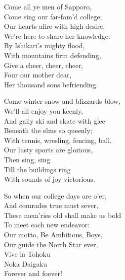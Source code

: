 \documentclass[10pt,b5j]{tarticle} %
\begin{document}
\vspace{1.5em} %
\newcommand{\linespace}{0.5em} %
\newcommand{\blocksize}{0.5\hsize} %
\begin{enumerate} %
    \begin{minipage}[c]{\blocksize}
    
        \vspace{\linespace}
        \item
        Come all ye men of Sapporo,\\
          Come sing our far-fam'd college;\\
        Our hearts afire with high desire,\\
          We're here to share her knowledge:\\
        By Ishikari's mighty flood,\\
          With mountains firm defending,\\
            Give a cheer, cheer, cheer,\\
            Four our mother dear,\\
          Her thousand sons befriending.
        
        \vspace{\linespace}
        \item
        Come winter snow and blizzards blow,\\
          We'll all enjoy you keenly,\\
        And gaily ski and skate with glee\\
          Beneath the elms so queenly;\\
        With tennis, wresling, fencing, ball,\\
          Our lusty sports are glorious,\\
            Then sing, sing\\
            Till the buildings ring\\
        With sounds of joy victorious.
        
        \vspace{\linespace}
        \item
        So when our college days are o'er,\\
          And comrades true must sever,\\
        These mem'ries old shall make us bold\\
          To meet each new endeavor:\\
        Our motto, Be Ambitious, Boys,\\
          Our guide the North Star ever,\\
            Vive la Tohoku\\
            Noka Daigaku\\
        Forever and foever!
        

\end{minipage}
\end{enumerate}
\end{document}
